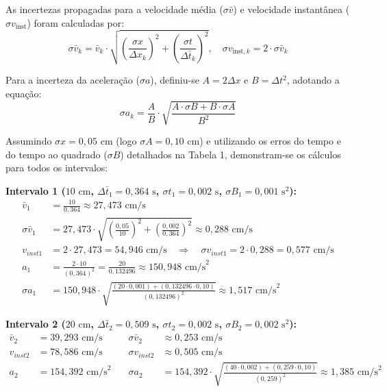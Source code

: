 \documentclass[12pt, a4paper]{article}
\begin{document}
As incertezas propagadas para a velocidade média ($\sigma\bar{v}$) e velocidade instantânea ($\sigma v_{\text{inst}}$) foram calculadas por:
\begin{equation}
    \sigma\bar{v}_k = \bar{v}_k \cdot \sqrt{\left(\frac{\sigma x}{\Delta x_k}\right)^2 + \left(\frac{\sigma t}{\Delta \bar{t}_k}\right)^2}, \quad \sigma v_{\text{inst},k} = 2 \cdot \sigma\bar{v}_k
\end{equation}

Para a incerteza da aceleração ($\sigma a$), definiu-se $A = 2\Delta x$ e $B = \Delta t^2$, adotando a equação:
\begin{equation}
    \sigma a_k = \frac{A}{B} \cdot \sqrt{\frac{A \cdot \sigma B + B \cdot \sigma A}{B^2}}
\end{equation}

Assumindo $\sigma x = 0,05\text{ cm}$ (logo $\sigma A = 0,10\text{ cm}$) e utilizando os erros do tempo e do tempo ao quadrado ($\sigma B$) detalhados na Tabela 1, demonstram-se os cálculos para todos os intervalos:

\vspace{0.3cm}
\noindent \textbf{Intervalo 1 ($10\text{ cm}$, $\Delta \bar{t}_1 = 0,364\text{ s}$, $\sigma t_1 = 0,002\text{ s}$, $\sigma B_1 = 0,001\text{ s}^2$):}
\begin{align*}
    \bar{v}_{1} &= \frac{10}{0,364} \approx 27,473\text{ cm/s} \\
    \sigma\bar{v}_{1} &= 27,473 \cdot \sqrt{\left(\frac{0,05}{10}\right)^2 + \left(\frac{0,002}{0,364}\right)^2} \approx 0,288\text{ cm/s} \\
    v_{inst1} &= 2 \cdot 27,473 = 54,946\text{ cm/s} \quad \Rightarrow \quad \sigma v_{inst1} = 2 \cdot 0,288 = 0,577\text{ cm/s} \\
    a_1 &= \frac{2 \cdot 10}{(0,364)^2} = \frac{20}{0,132496} \approx 150,948\text{ cm/s}^2 \\
    \sigma a_1 &= 150,948 \cdot \sqrt{\frac{(20 \cdot 0,001) + (0,132496 \cdot 0,10)}{(0,132496)^2}} \approx 1,517\text{ cm/s}^2
\end{align*}

\noindent \textbf{Intervalo 2 ($20\text{ cm}$, $\Delta \bar{t}_2 = 0,509\text{ s}$, $\sigma t_2 = 0,002\text{ s}$, $\sigma B_2 = 0,002\text{ s}^2$):}
\begin{align*}
    \bar{v}_{2} &= 39,293\text{ cm/s} \quad &\sigma\bar{v}_{2} &\approx 0,253\text{ cm/s} \\
    v_{inst2} &= 78,586\text{ cm/s} \quad &\sigma v_{inst2} &\approx 0,505\text{ cm/s} \\
    a_2 &= 154,392\text{ cm/s}^2 \quad &\sigma a_2 &= 154,392 \cdot \sqrt{\frac{(40 \cdot 0,002) + (0,259 \cdot 0,10)}{(0,259)^2}} \approx 1,385\text{ cm/s}^2
\end{align*}
\end{document}
